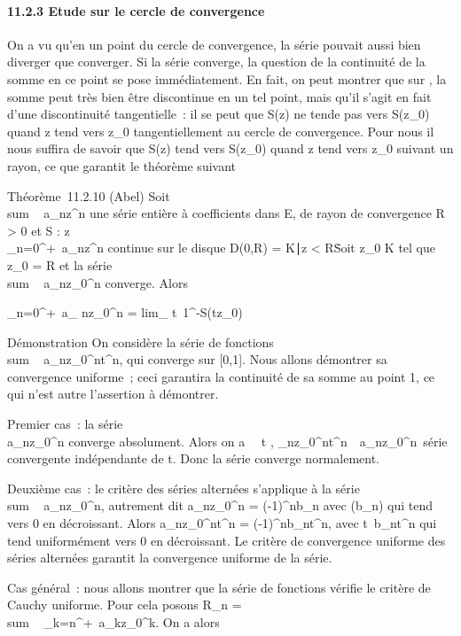 \documentclass[]{article}
\begin{document}
\paragraph{11.2.3 Etude sur le cercle de convergence}

On a vu qu'en un point du cercle de convergence, la série pouvait aussi
bien diverger que converger. Si la série converge, la question de la
continuité de la somme en ce point se pose immédiatement. En fait, on
peut montrer que sur , la somme peut très bien être discontinue en un
tel point, mais qu'il s'agit en fait d'une discontinuité tangentielle~:
il se peut que S(z) ne tende pas vers S(z_0) quand z tend vers
z_0 tangentiellement au cercle de convergence. Pour nous il
nous suffira de savoir que S(z) tend vers S(z_0) quand z tend
vers z_0 suivant un rayon, ce que garantit le théorème suivant

Théorème~11.2.10 (Abel) Soit
\\sum ~
a_nz^n une série entière à coefficients dans E, de
rayon de convergence R > 0 et S :
z\mapsto~\\\sum
 _n=0^+\infty~a_nz^n continue sur le
disque D(0,R) = \z \in
K∣z <
R\. Soit z_0 \in K tel que
z_0 = R et la série
\\sum ~
a_nz_0^n converge. Alors

\sum _n=0^+\infty~a_
nz_0^n = lim_
t\rightarrow~1^-S(tz_0)

Démonstration On considère la série de fonctions
\\sum ~
a_nz_0^nt^n, qui converge sur
[0,1]. Nous allons démontrer sa convergence uniforme~; ceci
garantira la continuité de sa somme au point 1, ce qui n'est autre
l'assertion à démontrer.

Premier cas~: la série \\\sum
 a_nz_0^n converge absolument. Alors on a
\forall~~t \in [0,1],
\a_nz_0^nt^n\
\leq\
a_nz_0^n\, série
convergente indépendante de t. Donc la série converge normalement.

Deuxième cas~: le critère des séries alternées s'applique à la série
\\sum ~
a_nz_0^n, autrement dit
a_nz_0^n = (-1)^nb_n avec
(b_n) qui tend vers 0 en décroissant. Alors
a_nz_0^nt^n =
(-1)^nb_nt^n, avec
t\mapsto~b_nt^n qui tend
uniformément vers 0 en décroissant. Le critère de convergence uniforme
des séries alternées garantit la convergence uniforme de la série.

Cas général~: nous allons montrer que la série de fonctions vérifie le
critère de Cauchy uniforme. Pour cela posons R_n
= \\sum ~
_k=n^+\infty~a_kz_0^k. On a alors
\end{document}
